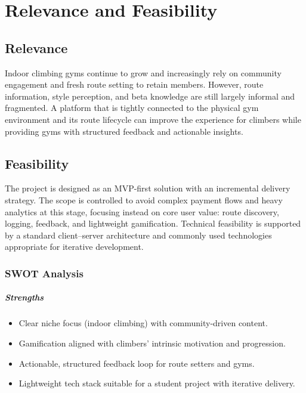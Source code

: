 \documentclass[12pt,a4paper]{report}
\renewcommand\_{\textunderscore\hspace{0pt}}
\begin{document}
\chapter{Relevance and Feasibility}

\section{Relevance}

Indoor climbing gyms continue to grow and increasingly rely on community engagement and fresh route setting to retain members. However, route information, style perception, and beta knowledge are still largely informal and fragmented. A platform that is tightly connected to the physical gym environment and its route lifecycle can improve the experience for climbers while providing gyms with structured feedback and actionable insights.

\section{Feasibility}

The project is designed as an MVP-first solution with an incremental delivery strategy. The scope is controlled to avoid complex payment flows and heavy analytics at this stage, focusing instead on core user value: route discovery, logging, feedback, and lightweight gamification. Technical feasibility is supported by a standard client--server architecture and commonly used technologies appropriate for iterative development.

\subsection{SWOT Analysis}

\paragraph{Strengths}
\begin{itemize}[noitemsep]
    \item Clear niche focus (indoor climbing) with community-driven content.
    \item Gamification aligned with climbers' intrinsic motivation and progression.
    \item Actionable, structured feedback loop for route setters and gyms.
    \item Lightweight tech stack suitable for a student project with iterative delivery.
\end{itemize}
\end{document}
